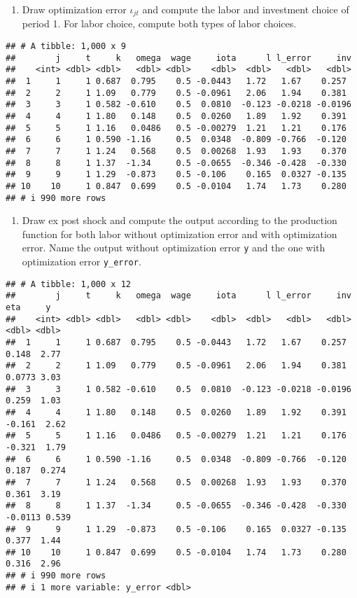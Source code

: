 \documentclass[
]{book}
\providecommand{\tightlist}{%
  \setlength{\itemsep}{0pt}\setlength{\parskip}{0pt}}
\begin{document}
\begin{enumerate}
\def\labelenumi{\arabic{enumi}.}
\setcounter{enumi}{6}
\tightlist
\item
  Draw optimization error \(\iota_{jt}\) and compute the labor and investment choice of period 1. For labor choice, compute both types of labor choices.
\end{enumerate}

\begin{verbatim}
## # A tibble: 1,000 x 9
##        j     t     k   omega  wage     iota      l l_error     inv
##    <int> <dbl> <dbl>   <dbl> <dbl>    <dbl>  <dbl>   <dbl>   <dbl>
##  1     1     1 0.687  0.795    0.5 -0.0443   1.72   1.67    0.257 
##  2     2     1 1.09   0.779    0.5 -0.0961   2.06   1.94    0.381 
##  3     3     1 0.582 -0.610    0.5  0.0810  -0.123 -0.0218 -0.0196
##  4     4     1 1.80   0.148    0.5  0.0260   1.89   1.92    0.391 
##  5     5     1 1.16   0.0486   0.5 -0.00279  1.21   1.21    0.176 
##  6     6     1 0.590 -1.16     0.5  0.0348  -0.809 -0.766  -0.120 
##  7     7     1 1.24   0.568    0.5  0.00268  1.93   1.93    0.370 
##  8     8     1 1.37  -1.34     0.5 -0.0655  -0.346 -0.428  -0.330 
##  9     9     1 1.29  -0.873    0.5 -0.106    0.165  0.0327 -0.135 
## 10    10     1 0.847  0.699    0.5 -0.0104   1.74   1.73    0.280 
## # i 990 more rows
\end{verbatim}

\begin{enumerate}
\def\labelenumi{\arabic{enumi}.}
\setcounter{enumi}{7}
\tightlist
\item
  Draw ex post shock and compute the output according to the production function for both labor without optimization error and with optimization error. Name the output without optimization error \texttt{y} and the one with optimization error \texttt{y\_error}.
\end{enumerate}

\begin{verbatim}
## # A tibble: 1,000 x 12
##        j     t     k   omega  wage     iota      l l_error     inv     eta     y
##    <int> <dbl> <dbl>   <dbl> <dbl>    <dbl>  <dbl>   <dbl>   <dbl>   <dbl> <dbl>
##  1     1     1 0.687  0.795    0.5 -0.0443   1.72   1.67    0.257   0.148  2.77 
##  2     2     1 1.09   0.779    0.5 -0.0961   2.06   1.94    0.381   0.0773 3.03 
##  3     3     1 0.582 -0.610    0.5  0.0810  -0.123 -0.0218 -0.0196  0.259  1.03 
##  4     4     1 1.80   0.148    0.5  0.0260   1.89   1.92    0.391  -0.161  2.62 
##  5     5     1 1.16   0.0486   0.5 -0.00279  1.21   1.21    0.176  -0.321  1.79 
##  6     6     1 0.590 -1.16     0.5  0.0348  -0.809 -0.766  -0.120   0.187  0.274
##  7     7     1 1.24   0.568    0.5  0.00268  1.93   1.93    0.370   0.361  3.19 
##  8     8     1 1.37  -1.34     0.5 -0.0655  -0.346 -0.428  -0.330  -0.0113 0.539
##  9     9     1 1.29  -0.873    0.5 -0.106    0.165  0.0327 -0.135   0.377  1.44 
## 10    10     1 0.847  0.699    0.5 -0.0104   1.74   1.73    0.280   0.316  2.96 
## # i 990 more rows
## # i 1 more variable: y_error <dbl>
\end{verbatim}
\end{document}
